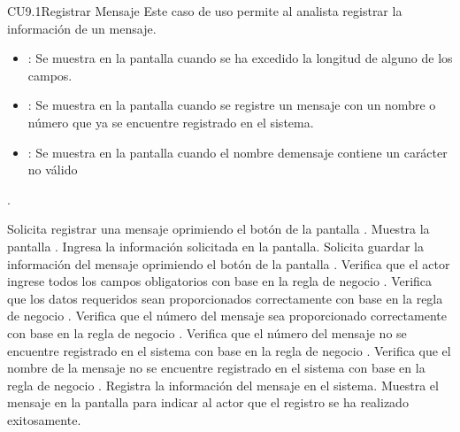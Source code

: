 \begin{UseCase}{CU9.1}{Registrar Mensaje}{
		Este caso de uso permite al analista registrar la información de un mensaje.
	}
{\begin{itemize}
		\item {}: Se muestra en la pantalla  cuando se ha excedido la longitud de alguno de los campos.
		\item {}: Se muestra en la pantalla  cuando se registre un mensaje con un nombre o número que ya se encuentre registrado en el sistema.
		\item {}: Se muestra en la pantalla  cuando el nombre demensaje contiene un carácter no válido
		\end{itemize}.
		}
	\end{UseCase}
	\begin{UCtrayectoria}
		\UCpaso[\UCactor] Solicita registrar una mensaje oprimiendo el botón  de la pantalla .
		\UCpaso[\UCsist] Muestra la pantalla .
		\UCpaso[\UCactor] Ingresa la información solicitada en la pantalla. \label{CU9.1-P3} 
		\UCpaso[\UCactor] Solicita guardar la información del mensaje oprimiendo el botón  de la pantalla . \label{CU9.1-P4}  
		\UCpaso[\UCsist] Verifica que el actor ingrese todos los campos obligatorios con base en la regla de negocio . 
		\UCpaso[\UCsist] Verifica que los datos requeridos sean proporcionados correctamente con base en la regla de negocio .  
		\UCpaso[\UCsist] Verifica que el número del mensaje sea proporcionado correctamente con base en la regla de negocio . 
		\UCpaso[\UCsist] Verifica que el número del mensaje no se encuentre registrado en el sistema con base en la regla de negocio . 
		\UCpaso[\UCsist] Verifica que el nombre de la mensaje no se encuentre registrado en el sistema con base en la regla de negocio .  
		\UCpaso[\UCsist] Registra la información del mensaje en el sistema.
		\UCpaso[\UCsist] Muestra el mensaje  en la pantalla  para indicar al actor que el registro se ha realizado exitosamente.
	\end{UCtrayectoria}		
	
